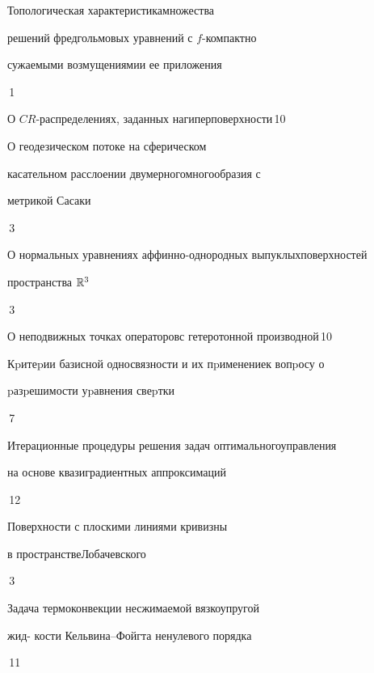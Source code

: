 

{Топологическая характеристика\newline множества


решений фредгольмовых уравнений с $f$-компактно 


сужаемыми возмущениями\newline и ее приложения}{\No\,1}




{О $CR$-распределениях, заданных на\newline гиперповерхности}{\No\,10}




{О геодезическом потоке на сферическом  


касательном расслоении двумерного\newline многообразия с  


метрикой Сасаки}{\No\,3}




{О нормальных уравнениях аффинно-однородных выпуклых\newline поверхностей


пространства $\Bbb R^3$}{\No\,3}




{О неподвижных точках операторов\newline с гетеротонной производной}{\No\,10}




{Кpитеpии базисной односвязности и их пpименение\newline к вопpосу о


pазpешимости уpавнения свеpтки}{\No\,7}




{Итерационные процедуры решения задач оптимального\newline управления


на основе квазиградиентных аппроксимаций}{\No\,12}




{Поверхности с плоскими линиями кривизны


в пространстве\newline Лобачевского}{\No\,3}




{Задача термоконвекции несжимаемой вязкоупругой


жид- \newline кости Кельвина--Фойгта ненулевого порядка}{\No\,11}


